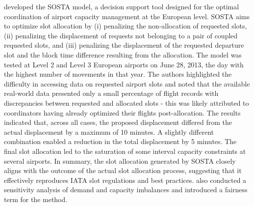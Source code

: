  developed the \acrfull{SOSTA} model, a decision support tool designed for the optimal coordination of airport capacity management at the European level. \acrshort{SOSTA} aims to optimize slot allocation by (i) penalizing the non-allocation of requested slots, (ii) penalizing the displacement of requests not belonging to a pair of coupled requested slots, and (iii) penalizing the displacement of the requested departure slot and the block time difference resulting from the allocation. The model was tested at Level 2 and Level 3 European airports on June 28, 2013, the day with the highest number of movements in that year. The authors highlighted the difficulty in accessing data on requested airport slots and noted that the available real-world data presented only a small percentage of flight records with discrepancies between requested and allocated slots - this was likely attributed to coordinators having already optimized their flights post-allocation. The results indicated that, across all cases, the proposed displacement differed from the actual displacement by a maximum of 10 minutes. A slightly different combination enabled a reduction in the total displacement by 5 minutes. The final slot allocation led to the saturation of some interval capacity constraints at several airports. In summary, the slot allocation generated by \acrshort{SOSTA} closely aligns with the outcome of the actual slot allocation process, suggesting that it effectively reproduces IATA slot regulations and best practices.  also conducted a sensitivity analysis of demand and capacity imbalances and introduced a fairness term for the method.

